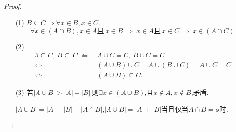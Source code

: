 \documentclass[UTF8]{ctexart}
\begin{document}
\subsection{}   %
\begin{proof}
    \begin{enumerate}
        \item []
        \item [(1)]
        $B \subseteq C \Rightarrow \forall x \in B,x \in C$.
        \[
            \forall x \in (A \cap B),x \in A \mbox{且} \ x \in B
            \ \Rightarrow\ x \in A \mbox{且} \ x \in C
            \ \Rightarrow\ x \in (A \cap C)
        \]
        \item [(2)]
        \begin{align*}
            A\subseteq C,\ B\subseteq\ C 
            \ \Leftrightarrow\ &
            A\cup C=C,\ B\cup C=C\\
            \ \Leftrightarrow\ &
            \left(A\cup B\right)\cup C
            =A\cup \left(B\cup C\right)
            =A\cup C
            =C\\
            \ \Leftrightarrow\ &
            \left(A\cup B\right) \subseteq C.
        \end{align*}
        \item [(3)]
        若$|A \cup B| > |A| + |B|$,则$\exists x \in (A\cup B)$,且$x \notin A,x \notin B$,矛盾.

        $|A \cup B| = |A| + |B| - |A \cap B|$,$|A \cup B| = |A| + |B|$当且仅当$A \cap B =\phi $时.
    \end{enumerate}
\end{proof}
\end{document}

